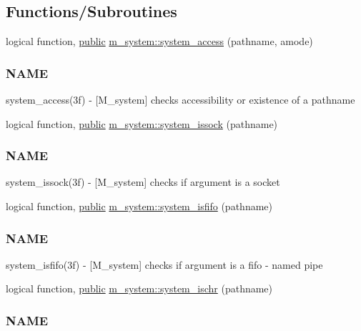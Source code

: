 \subsection*{Functions/\+Subroutines}
\begin{DoxyCompactItemize}
\item 
logical function, \hyperlink{M__stopwatch_83_8txt_a2f74811300c361e53b430611a7d1769f}{public} \hyperlink{namespacem__system_a4687a363acbb7084a51bc77844789275}{m\+\_\+system\+::system\+\_\+access} (pathname, amode)
\begin{DoxyCompactList}\small\item\em \subsubsection*{N\+A\+ME}

system\+\_\+access(3f) -\/ \mbox{[}M\+\_\+system\mbox{]} checks accessibility or existence of a pathname \end{DoxyCompactList}\item 
logical function, \hyperlink{M__stopwatch_83_8txt_a2f74811300c361e53b430611a7d1769f}{public} \hyperlink{namespacem__system_af6eb5074fe74552bc7a5e7d00f459087}{m\+\_\+system\+::system\+\_\+issock} (pathname)
\begin{DoxyCompactList}\small\item\em \subsubsection*{N\+A\+ME}

system\+\_\+issock(3f) -\/ \mbox{[}M\+\_\+system\mbox{]} checks if argument is a socket \end{DoxyCompactList}\item 
logical function, \hyperlink{M__stopwatch_83_8txt_a2f74811300c361e53b430611a7d1769f}{public} \hyperlink{namespacem__system_acbcaa0c5075ca103815f441ee410e1a3}{m\+\_\+system\+::system\+\_\+isfifo} (pathname)
\begin{DoxyCompactList}\small\item\em \subsubsection*{N\+A\+ME}

system\+\_\+isfifo(3f) -\/ \mbox{[}M\+\_\+system\mbox{]} checks if argument is a fifo -\/ named pipe \end{DoxyCompactList}\item 
logical function, \hyperlink{M__stopwatch_83_8txt_a2f74811300c361e53b430611a7d1769f}{public} \hyperlink{namespacem__system_a12a948fa4aacda084a538ae3a5ae3cc6}{m\+\_\+system\+::system\+\_\+ischr} (pathname)
\begin{DoxyCompactList}\small\item\em \subsubsection*{N\+A\+ME}


\end{DoxyCompactList}
\end{DoxyCompactItemize}
